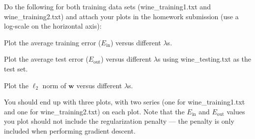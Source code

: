 \problem[16]
Do the following for both training data sets (wine\_training1.txt and wine\_training2.txt) and attach your plots in the homework submission (use a log-scale on the horizontal axis):

\subproblem Plot the average training error ($E_\text{in}$) versus different $\lambda$s.

\subproblem Plot the average test error ($E_\text{out}$) versus different $\lambda$s using wine\_testing.txt as the test set.

\subproblem Plot the $\ell_2$ norm of $\mathbf{w}$ versus different $\lambda$s. \medskip

 You should end up with three plots, with two series (one for wine\_training1.txt and one for wine\_training2.txt) on each plot. Note that the $E_\text{in}$ and $E_\text{out}$ values you plot should not include the regularization penalty --- the penalty is only included when performing gradient descent.

